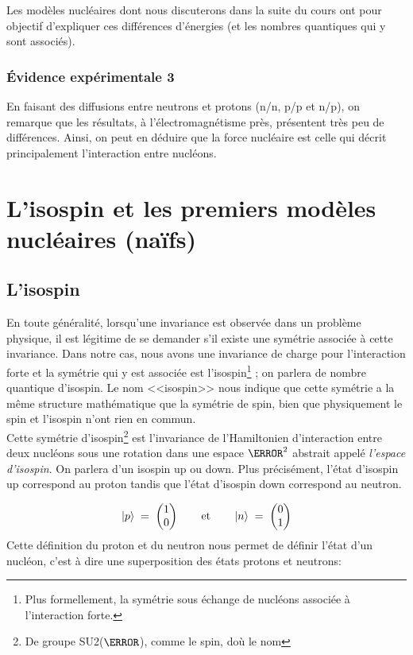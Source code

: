 Les modèles nucléaires dont nous discuterons dans la suite du cours ont pour objectif d'expliquer ces différences d'énergies (et les nombres quantiques qui y sont associés).


\subsubsection{Évidence expérimentale 3}

En faisant des diffusions entre neutrons et protons (n/n, p/p et n/p), on remarque que les résultats, à l'électromagnétisme près, présentent très peu de différences. Ainsi, on peut en déduire que la force nucléaire est celle qui décrit principalement l'interaction entre nucléons.

\section{L'isospin et les premiers modèles nucléaires (naïfs)}

\subsection{L'isospin}

En toute généralité, lorsqu'une invariance est observée dans un problème physique, il est légitime de se demander s'il existe une symétrie associée à cette invariance. Dans notre cas, nous avons une invariance de charge pour l'interaction forte et la symétrie qui y est associée est l'isospin\footnote{Plus formellement, la symétrie sous échange de nucléons associée à l'interaction forte.} ; on parlera de nombre quantique d'isospin. Le nom <<isospin>> nous indique que cette symétrie a la même structure mathématique que la symétrie de spin, bien que physiquement le spin et l'isospin n'ont rien en commun.\\

Cette symétrie d'isospin\footnote{De groupe SU2($\C$), comme le spin, doù le nom} est l'invariance de l'Hamiltonien d'interaction entre deux nucléons sous une rotation dans une espace $\C^2$ abstrait appelé \emph{l'espace d'isospin}. On parlera d'un isospin up ou down. Plus précisément, l'état d'isospin up correspond au proton tandis que l'état d'isospin down correspond au neutron.

\[
    \ket{p} \; = \; 
    \begin{pmatrix}
    1 \\ 0
    \end{pmatrix}
    \qquad \text{et}\qquad
    \ket{n} \; = \; 
    \begin{pmatrix}
    0 \\ 1
    \end{pmatrix}
\]
Cette définition du proton et du neutron nous permet de définir l'état d'un nucléon, c'est à dire une superposition des états protons et neutrons:

